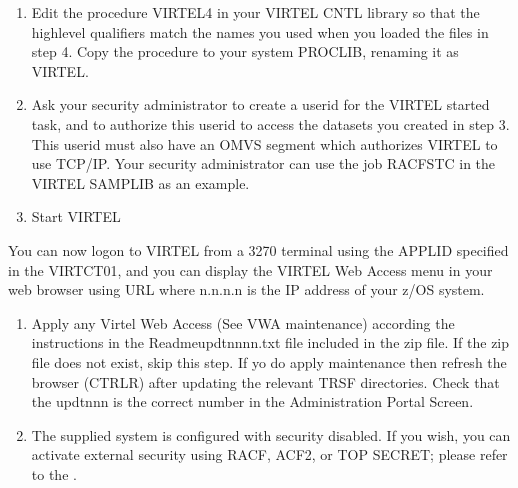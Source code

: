 \documentclass[letterpaper,10pt,english]{sphinxmanual}
\begin{document}
\begin{sphinxVerbatim}[commandchars=\\\{\}]
 
\end{sphinxVerbatim}
\begin{enumerate}
%
\setcounter{enumi}{11}
\item {} 
\sphinxAtStartPar
Edit the procedure VIRTEL4 in your VIRTEL CNTL library so that the high\sphinxhyphen{}level qualifiers match the names you used when you loaded the files in step 4. Copy the procedure to your system PROCLIB, renaming it as VIRTEL.

\item {} 
\sphinxAtStartPar
Ask your security administrator to create a userid for the VIRTEL started task, and to authorize this userid to access the datasets you created in step 3. This userid must also have an OMVS segment which authorizes VIRTEL to use TCP/IP. Your security administrator can use the job RACFSTC in the VIRTEL SAMPLIB as an example.

\item {} 
\sphinxAtStartPar
Start VIRTEL

\end{enumerate}

\sphinxAtStartPar
You can now logon to VIRTEL from a 3270 terminal using the APPLID specified in the VIRTCT01, and you can display the VIRTEL Web Access menu in your web browser using URL  where n.n.n.n is the IP address of your z/OS system.
\begin{enumerate}
%
\setcounter{enumi}{14}
\item {} 
\sphinxAtStartPar
Apply any Virtel Web Access (See VWA maintenance) according the instructions in the Readme\sphinxhyphen{}updtnnnn.txt file included in the zip file. If the zip file does not exist, skip this step. If yo do apply maintenance then refresh the browser (CTRL\sphinxhyphen{}R) after updating the relevant TRSF directories. Check that the updtnnn is the correct number in the Administration Portal Screen.

\item {} 
\sphinxAtStartPar
The supplied system is configured with security disabled. If you wish, you can activate external security using RACF, ACF2, or TOP SECRET; please refer to the {\hyperref[\detokenize{Installation_Guide:vvrrig-security}]{}}.

\end{enumerate}
\end{document}
